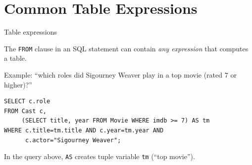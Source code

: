 \documentclass[xcolor={usenames,dvipsnames}]{beamer}
\begin{document}
\section{Common Table Expressions}

%
%

\begin{frame}[fragile]{Table expressions}

The \lstinline[style=SQL]{FROM} clause in an SQL statement can contain \emph{any expression} that computes a table.

Example: ``which roles did Sigourney Weaver play in a top movie (rated 7 or higher)?''

\begin{lstlisting}[style=SQL]
SELECT c.role
FROM Cast c, 
     (SELECT title, year FROM Movie WHERE imdb >= 7) AS tm
WHERE c.title=tm.title AND c.year=tm.year AND
      c.actor="Sigourney Weaver";
\end{lstlisting}

In the query above, \lstinline[style=SQL]{AS} creates tuple variable \texttt{tm} (``top movie'').
\end{frame}

%
%

\end{document}
